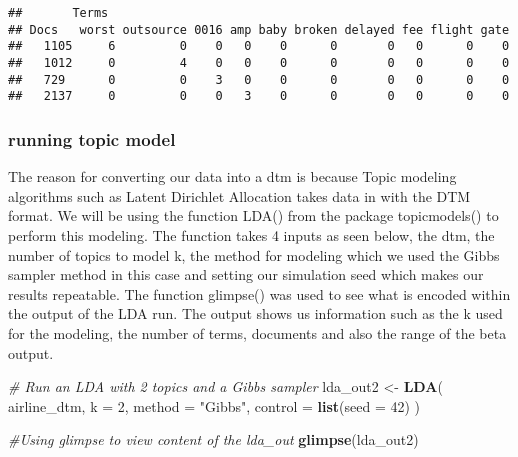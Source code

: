\documentclass[
]{article}
\newenvironment{Shaded}{\begin{snugshade}}{\end{snugshade}}
\newcommand{\CommentTok}[1]{\textcolor[rgb]{0.56,0.35,0.01}{\textit{#1}}}
\newcommand{\DataTypeTok}[1]{\textcolor[rgb]{0.13,0.29,0.53}{#1}}
\newcommand{\DecValTok}[1]{\textcolor[rgb]{0.00,0.00,0.81}{#1}}
\newcommand{\KeywordTok}[1]{\textcolor[rgb]{0.13,0.29,0.53}{\textbf{#1}}}
\newcommand{\NormalTok}[1]{#1}
\newcommand{\StringTok}[1]{\textcolor[rgb]{0.31,0.60,0.02}{#1}}
\begin{document}
\begin{verbatim}
##       Terms
## Docs   worst outsource 0016 amp baby broken delayed fee flight gate
##   1105     6         0    0   0    0      0       0   0      0    0
##   1012     0         4    0   0    0      0       0   0      0    0
##   729      0         0    3   0    0      0       0   0      0    0
##   2137     0         0    0   3    0      0       0   0      0    0
\end{verbatim}

\hypertarget{running-topic-model}{%
\subsubsection{running topic model}\label{running-topic-model}}

The reason for converting our data into a dtm is because Topic modeling
algorithms such as Latent Dirichlet Allocation takes data in with the
DTM format. We will be using the function LDA() from the package
topicmodels() to perform this modeling. The function takes 4 inputs as
seen below, the dtm, the number of topics to model k, the method for
modeling which we used the Gibbs sampler method in this case and setting
our simulation seed which makes our results repeatable. The function
glimpse() was used to see what is encoded within the output of the LDA
run. The output shows us information such as the k used for the
modeling, the number of terms, documents and also the range of the beta
output.

\begin{Shaded}
\begin{Highlighting}[]
\CommentTok{# Run an LDA with 2 topics and a Gibbs sampler}
\NormalTok{lda_out2 <-}\StringTok{ }\KeywordTok{LDA}\NormalTok{(}
\NormalTok{  airline_dtm,}
  \DataTypeTok{k =} \DecValTok{2}\NormalTok{,}
  \DataTypeTok{method =} \StringTok{"Gibbs"}\NormalTok{,}
  \DataTypeTok{control =} \KeywordTok{list}\NormalTok{(}\DataTypeTok{seed =} \DecValTok{42}\NormalTok{)}
\NormalTok{)}

\CommentTok{#Using glimpse to view content of the lda_out}
\KeywordTok{glimpse}\NormalTok{(lda_out2)}
\end{Highlighting}
\end{Shaded}
\end{document}

